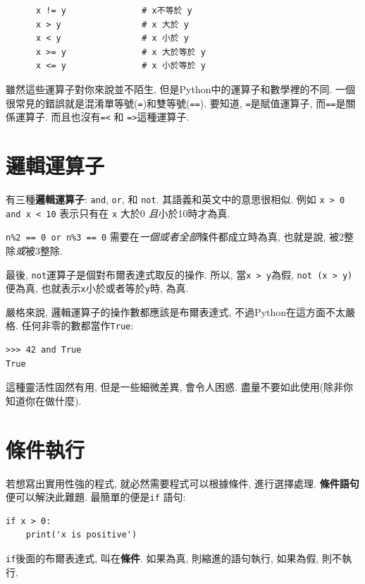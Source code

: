 \documentclass[10pt]{book}
\begin{document}
\begin{verbatim}
      x != y               # x不等於 y
      x > y                # x 大於 y
      x < y                # x 小於 y
      x >= y               # x 大於等於 y
      x <= y               # x 小於等於 y
\end{verbatim}
%
雖然這些運算子對你來說並不陌生, 但是Python中的運算子和數學裡的不同. 
一個很常見的錯誤就是混淆單等號({\tt =})和雙等號({\tt ==}). 
要知道,  {\tt =}是賦值運算子, 而{\tt ==}是關係運算子. 
而且也沒有{\tt =<} 和 {\tt =>}這種運算子. 


\section {邏輯運算子}

有三種{\bf 邏輯運算子}: {\tt and}, {\tt or}, 和 {\tt not}.
其語義和英文中的意思很相似. 例如
{\tt x > 0 and x < 10} 表示只有在 {\tt x} 大於0 {\em 且}小於10時才為真.

{\tt n\%2 == 0 or n\%3 == 0} 需要在{\em 一個或者全部}條件都成立時為真, 
也就是說, 被2整除{\em 或}被3整除. 

最後, {\tt not}運算子是個對布爾表達式取反的操作. 
所以, 當{\tt x > y}為假,  {\tt not (x > y)}便為真, 
也就表示{\tt x}小於或者等於{\tt y}時, 為真.

嚴格來說, 邏輯運算子的操作數都應該是布爾表達式, 不過Python在這方面不太嚴格. 
任何非零的數都當作{\tt True}:

\begin{verbatim}
>>> 42 and True
True
\end{verbatim}
%
這種靈活性固然有用, 但是一些細微差異, 會令人困惑. 
盡量不要如此使用(除非你知道你在做什麼).


\section{條件執行}
\label{conditional.execution}

若想寫出實用性強的程式, 就必然需要程式可以根據條件, 進行選擇處理. 
{\bf 條件語句} 便可以解決此難題. 
最簡單的便是{\tt if} 語句:

\begin{verbatim}
if x > 0:
    print('x is positive')
\end{verbatim}
%
{\tt if}後面的布爾表達式, 叫在{\bf 條件}. 
如果為真, 則縮進的語句執行, 如果為假, 則不執行. 
\end{document}
